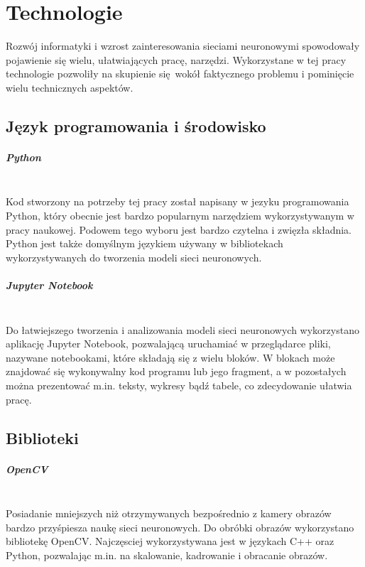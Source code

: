 
\chapter{Technologie}
Rozwój informatyki i wzrost zainteresowania sieciami neuronowymi spowodowały pojawienie
się wielu, ułatwiających pracę, narzędzi. Wykorzystane w tej pracy technologie
pozwoliły na skupienie się wokół faktycznego problemu i pominięcie wielu technicznych
aspektów.

\section{Język programowania i środowisko}

\paragraph{Python} \mbox{}\\
Kod stworzony na potrzeby tej pracy został napisany w jezyku programowania Python, który
obecnie jest bardzo popularnym narzędziem wykorzystywanym w pracy naukowej.
Podowem tego wyboru jest bardzo czytelna i zwięzła składnia. Python jest także domyślnym
językiem używany w bibliotekach wykorzystywanych do tworzenia modeli sieci neuronowych.

\paragraph{Jupyter Notebook} \mbox{}\\
Do łatwiejszego tworzenia i analizowania modeli sieci neuronowych wykorzystano aplikację
Jupyter Notebook, pozwalającą uruchamiać w przeglądarce pliki, nazywane notebookami,
które składają się z wielu bloków. W blokach może znajdować się wykonywalny kod programu
lub jego fragment, a w pozostałych można prezentować m.in. teksty, wykresy bądź tabele,
co zdecydowanie ułatwia pracę.\\

\section{Biblioteki}

\paragraph{OpenCV} \mbox{}\\
Posiadanie mniejszych niż otrzymywanych bezpośrednio z kamery obrazów bardzo przyśpiesza
naukę sieci neuronowych. Do obróbki obrazów wykorzystano bibliotekę OpenCV.
Najczęsciej wykorzystywana jest w językach C++ oraz Python, pozwalając m.in. na
skalowanie, kadrowanie i obracanie obrazów.

